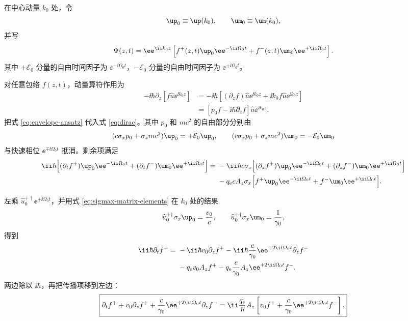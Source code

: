 在中心动量 $k_0$ 处，令
\[
 \up_0\equiv\up(k_0),
 \qquad
 \um_0\equiv\um(k_0),
\]
并写
\begin{equation}
 \Psi(z,t)=\ee^{\ii k_0z}
 \left[
 f^+(z,t)\up_0\ee^{-\ii\Omega_0t}
 +f^-(z,t)\um_0\ee^{+\ii\Omega_0t}
 \right].
 \label{eq:envelope-ansatz}
\end{equation}
其中 $+\mathcal E_0$ 分量的自由时间因子为 $\ee^{-\ii\Omega_0t}$，$-\mathcal E_0$ 分量的自由时间因子为 $\ee^{+\ii\Omega_0t}$。

对任意包络 $f(z,t)$，动量算符作用为
\begin{align}
 -\ii\hbar\partial_z\left[f\widehat u\ee^{\ii k_0z}\right]
 &=-\ii\hbar\left[(\partial_z f)\widehat u\ee^{\ii k_0z}
 +\ii k_0f\widehat u\ee^{\ii k_0z}\right]\\
 &=\left[p_0f-\ii\hbar\partial_z f\right]
 \widehat u\ee^{\ii k_0z}.
 \label{eq:momentum-envelope-action}
\end{align}
把式 \eqref{eq:envelope-ansatz} 代入式 \eqref{eq:dirac}。其中 $p_0$ 和 $mc^2$ 的自由部分分别由
\[
 (c\sigma_xp_0+\sigma_zmc^2)\up_0=+\mathcal E_0\up_0,
 \qquad
 (c\sigma_xp_0+\sigma_zmc^2)\um_0=-\mathcal E_0\um_0
\]
与快速相位 $\ee^{\mp\ii\Omega_0t}$ 抵消。剩余项满足
\begin{align}
 \ii\hbar\Bigl[
 (\partial_t f^+)\up_0\ee^{-\ii\Omega_0t}
 +(\partial_t f^-)\um_0\ee^{+\ii\Omega_0t}
 \Bigr]
 ={}&-\ii\hbar c\sigma_x\Bigl[
 (\partial_z f^+)\up_0\ee^{-\ii\Omega_0t}
 +(\partial_z f^-)\um_0\ee^{+\ii\Omega_0t}
 \Bigr]\notag\\
 &-q_{\rm e}cA_z\sigma_x\Bigl[
 f^+\up_0\ee^{-\ii\Omega_0t}
 +f^-\um_0\ee^{+\ii\Omega_0t}
 \Bigr].
 \label{eq:after-free-cancel}
\end{align}

左乘 $\widehat u_0^{+\dagger}\ee^{+\ii\Omega_0t}$，并用式 \eqref{eq:sigmax-matrix-elements} 在 $k_0$ 处的结果
\[
 \widehat u_0^{+\dagger}\sigma_x\up_0=\frac{v_0}{c},
 \qquad
 \widehat u_0^{+\dagger}\sigma_x\um_0=\frac1{\gamma_0},
\]
得到
\begin{align}
 \ii\hbar\partial_t f^+
 ={}&-\ii\hbar v_0\partial_z f^+
 -\ii\hbar\frac{c}{\gamma_0}\ee^{+2\ii\Omega_0t}\partial_z f^-\\
 &-q_{\rm e}v_0A_zf^+
 -q_{\rm e}\frac{c}{\gamma_0}A_z\ee^{+2\ii\Omega_0t}f^-.
\end{align}
两边除以 $\ii\hbar$，再把传播项移到左边：
\begin{equation}
 \boxed{
 \partial_t f^+
 +v_0\partial_z f^+
 +\frac{c}{\gamma_0}\ee^{+2\ii\Omega_0t}\partial_z f^-
 =\ii\frac{q_{\rm e}}{\hbar}A_z
 \left[v_0f^+
 +\frac{c}{\gamma_0}\ee^{+2\ii\Omega_0t}f^-\right].}
 \label{eq:coupled-plus}
\end{equation}

